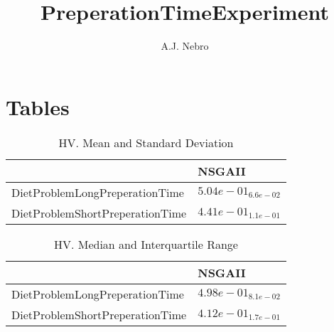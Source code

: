 \documentclass{article}
\title{PreperationTimeExperiment}
\author{A.J. Nebro}
\begin{document}
\maketitle
\section{Tables}

\begin{table}
\caption{HV. Mean and Standard Deviation}
\label{table: HV}
\centering
\begin{scriptsize}
\begin{tabular}{ll}
\hline &  NSGAII\\
\hline 
DietProblemLongPreperationTime & \cellcolor{gray95}$  5.04e-01_{ 6.6e-02}$ \\
DietProblemShortPreperationTime & \cellcolor{gray95}$  4.41e-01_{ 1.1e-01}$ \\
\hline
\end{tabular}
\end{scriptsize}
\end{table}

\begin{table}
\caption{HV. Median and Interquartile Range}
\label{table: HV}
\centering
\begin{scriptsize}
\begin{tabular}{ll}
\hline &  NSGAII\\
\hline 
DietProblemLongPreperationTime & \cellcolor{gray95}$  4.98e-01_{ 8.1e-02}$ \\
DietProblemShortPreperationTime & \cellcolor{gray95}$  4.12e-01_{ 1.7e-01}$ \\
\hline
\end{tabular}
\end{scriptsize}
\end{table}
\end{document}

